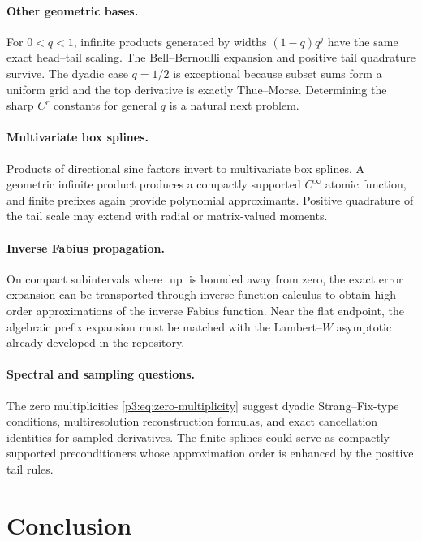 \documentclass[11pt,oneside]{article}
\numberwithin{equation}{section}
\theoremstyle{definition}
\theoremstyle{remark}
\newcommand{\Up}{\operatorname{up}}
\begin{document}
\paragraph{Other geometric bases.}
For $0<q<1$, infinite products generated by widths $(1-q)q^j$ have the same exact
head--tail scaling.  The Bell--Bernoulli expansion and positive tail quadrature survive.
The dyadic case $q=1/2$ is exceptional because subset sums form a uniform grid and the
top derivative is exactly Thue--Morse.  Determining the sharp $C^r$ constants for
general $q$ is a natural next problem.

\paragraph{Multivariate box splines.}
Products of directional sinc factors invert to multivariate box splines.  A geometric
infinite product produces a compactly supported $C^\infty$ atomic function, and finite
prefixes again provide polynomial approximants.  Positive quadrature of the tail scale
may extend with radial or matrix-valued moments.

\paragraph{Inverse Fabius propagation.}
On compact subintervals where $\Up$ is bounded away from zero, the exact error expansion
can be transported through inverse-function calculus to obtain high-order approximations
of the inverse Fabius function.  Near the flat endpoint, the algebraic prefix expansion
must be matched with the Lambert--$W$ asymptotic already developed in the repository.

\paragraph{Spectral and sampling questions.}
The zero multiplicities \cref{p3:eq:zero-multiplicity} suggest dyadic Strang--Fix-type
conditions, multiresolution reconstruction formulas, and exact cancellation identities
for sampled derivatives.  The finite splines could serve as compactly supported
preconditioners whose approximation order is enhanced by the positive tail rules.

\section{Conclusion}
\end{document}
